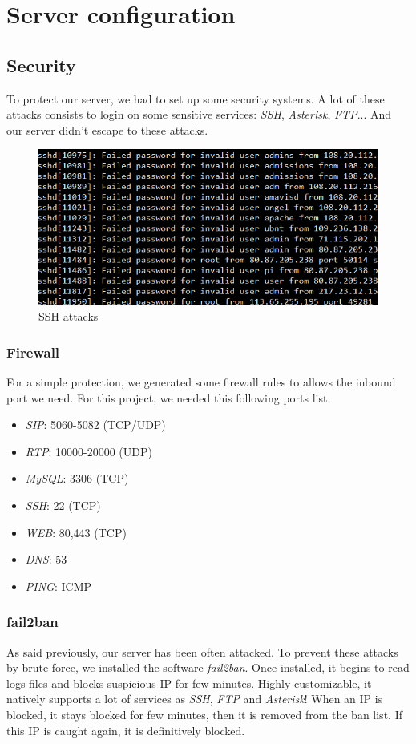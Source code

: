 \chapter{Server configuration}

\section{Security}

To protect our server, we had to set up some security systems. A lot of these attacks consists to login on some sensitive services: \textit{SSH}, \textit{Asterisk}, \textit{FTP}... And our server didn't escape to these attacks. 

\begin{figure}[!ht]
  \caption{SSH attacks}
  \centering
    \includegraphics[width=1\textwidth]{img/sshattacks.png}
\end{figure}

\subsection{Firewall}

For a simple protection, we generated some firewall rules to allows the inbound port we need. For this project, we needed this following ports list:
\begin{itemize}
\item \textit{SIP}: 5060-5082 (TCP/UDP)	
\item \textit{RTP}: 10000-20000 (UDP)
\item \textit{MySQL}: 3306 (TCP)
\item \textit{SSH}: 22 (TCP)
\item \textit{WEB}: 80,443 (TCP)
\item \textit{DNS}: 53 
\item \textit{PING}: ICMP
\end{itemize}

\subsection{fail2ban}
As said previously, our server has been often attacked. To prevent these attacks by brute-force, we installed the software \textit{fail2ban}. Once installed, it begins to read logs files and blocks suspicious IP for few minutes. Highly customizable, it natively supports a lot of services as \textit{SSH}, \textit{FTP} and \textit{Asterisk}! 
When an IP is blocked, it stays blocked for few minutes, then it is removed from the ban list. If this IP is caught again, it is definitively blocked.


